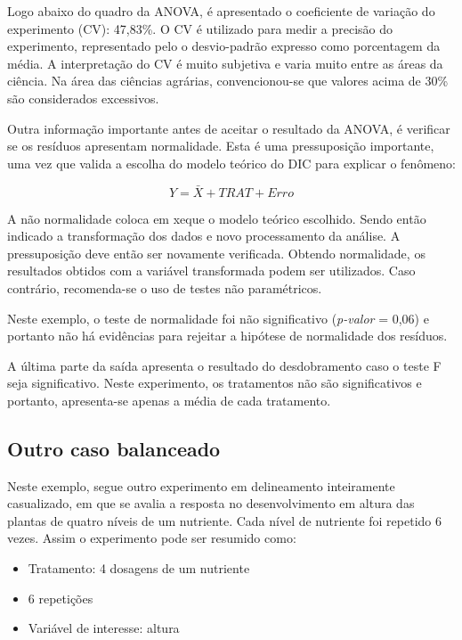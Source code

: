 \documentclass[
]{article}
\providecommand{\tightlist}{%
  \setlength{\itemsep}{0pt}\setlength{\parskip}{0pt}}
\begin{document}
Logo abaixo do quadro da ANOVA, é apresentado o coeficiente de variação do experimento (CV): 47,83\%. O CV é utilizado para medir a precisão do experimento, representado pelo o desvio-padrão expresso como porcentagem da média. A interpretação do CV é muito subjetiva e varia muito entre as áreas da ciência. Na área das ciências agrárias, convencionou-se que valores acima de 30\% são considerados excessivos.

Outra informação importante antes de aceitar o resultado da ANOVA, é verificar se os resíduos apresentam normalidade. Esta é uma pressuposição importante, uma vez que valida a escolha do modelo teórico do DIC para explicar o fenômeno:

\[Y = \bar{X} + TRAT + Erro\]

A não normalidade coloca em xeque o modelo teórico escolhido. Sendo então indicado a transformação dos dados e novo processamento da análise. A pressuposição deve então ser novamente verificada. Obtendo normalidade, os resultados obtidos com a variável transformada podem ser utilizados. Caso contrário, recomenda-se o uso de testes não paramétricos.

Neste exemplo, o teste de normalidade foi não significativo (\emph{p-valor} = 0,06) e portanto não há evidências para rejeitar a hipótese de normalidade dos resíduos.

A última parte da saída apresenta o resultado do desdobramento caso o teste F seja significativo. Neste experimento, os tratamentos não são significativos e portanto, apresenta-se apenas a média de cada tratamento.

\hypertarget{outro-caso-balanceado}{%
\subsection{Outro caso balanceado}\label{outro-caso-balanceado}}

Neste exemplo, segue outro experimento em delineamento inteiramente casualizado, em que se avalia a resposta no desenvolvimento em altura das plantas de quatro níveis de um nutriente. Cada nível de nutriente foi repetido 6 vezes. Assim o experimento pode ser resumido como:

\begin{itemize}
\tightlist
\item
  Tratamento: 4 dosagens de um nutriente
\item
  6 repetições
\item
  Variável de interesse: altura
\end{itemize}
\end{document}
